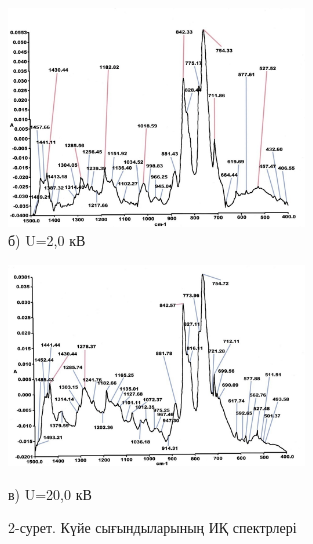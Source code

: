 \begin{figure}[H]
	\centering
	\includegraphics[width=0.7\textwidth]{assets/25}
	\caption*{б) U=2,0 кВ}
\end{figure}

\begin{figure}[H]
	\centering
	\includegraphics[width=0.7\textwidth]{assets/26}
	\caption*{в) U=20,0 кВ}
	\caption*{2-сурет. Күйе сығындыларының ИҚ спектрлері}
\end{figure}

